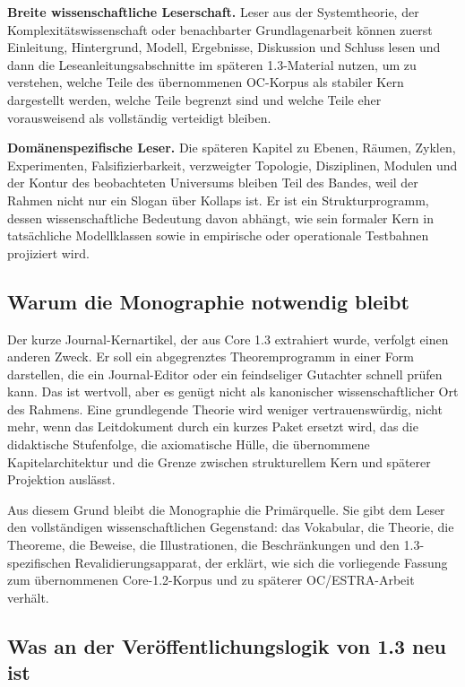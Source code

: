 \textbf{Breite wissenschaftliche Leserschaft.}
Leser aus der Systemtheorie, der Komplexitätswissenschaft oder benachbarter Grundlagenarbeit
können zuerst Einleitung, Hintergrund, Modell, Ergebnisse, Diskussion und Schluss lesen und dann
die Leseanleitungsabschnitte im späteren 1.3-Material nutzen, um zu verstehen, welche Teile des
übernommenen OC-Korpus als stabiler Kern dargestellt werden, welche Teile begrenzt sind und
welche Teile eher vorausweisend als vollständig verteidigt bleiben.

\textbf{Domänenspezifische Leser.}
Die späteren Kapitel zu Ebenen, Räumen, Zyklen, Experimenten, Falsifizierbarkeit, verzweigter
Topologie, Disziplinen, Modulen und der Kontur des beobachteten Universums bleiben Teil des
Bandes, weil der Rahmen nicht nur ein Slogan über Kollaps ist. Er ist ein Strukturprogramm,
dessen wissenschaftliche Bedeutung davon abhängt, wie sein formaler Kern in tatsächliche
Modellklassen sowie in empirische oder operationale Testbahnen projiziert wird.

\subsection{Warum die Monographie notwendig bleibt}

Der kurze Journal-Kernartikel, der aus Core 1.3 extrahiert wurde, verfolgt einen anderen Zweck.
Er soll ein abgegrenztes Theoremprogramm in einer Form darstellen, die ein Journal-Editor oder
ein feindseliger Gutachter schnell prüfen kann. Das ist wertvoll, aber es genügt nicht als
kanonischer wissenschaftlicher Ort des Rahmens. Eine grundlegende Theorie wird weniger
vertrauenswürdig, nicht mehr, wenn das Leitdokument durch ein kurzes Paket ersetzt wird, das die
didaktische Stufenfolge, die axiomatische Hülle, die übernommene Kapitelarchitektur und die
Grenze zwischen strukturellem Kern und späterer Projektion auslässt.

Aus diesem Grund bleibt die Monographie die Primärquelle. Sie gibt dem Leser den vollständigen
wissenschaftlichen Gegenstand: das Vokabular, die Theorie, die Theoreme, die Beweise, die
Illustrationen, die Beschränkungen und den 1.3-spezifischen Revalidierungsapparat, der erklärt,
wie sich die vorliegende Fassung zum übernommenen Core-1.2-Korpus und zu späterer OC/ESTRA-Arbeit
verhält.

\subsection{Was an der Veröffentlichungslogik von 1.3 neu ist}

